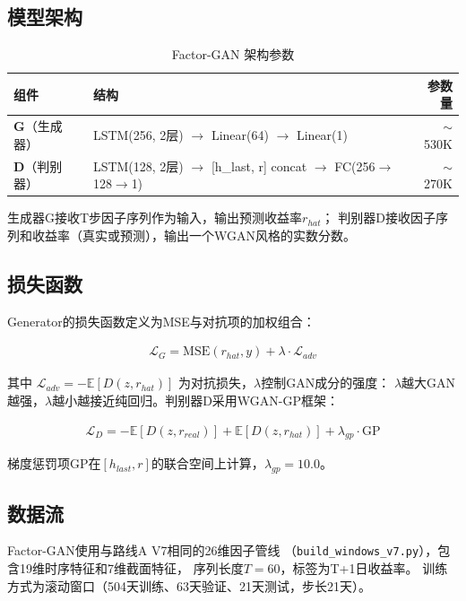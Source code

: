 \documentclass[12pt,a4paper]{ctexart}
\begin{document}
\subsection{模型架构}

\begin{table}[htbp]
\centering
\caption{Factor-GAN 架构参数}
\label{tab:factor_gan_arch}
\begin{tabular}{llr}
\toprule
组件 & 结构 & 参数量 \\
\midrule
\textbf{G}（生成器） & LSTM(256, 2层) $\to$ Linear(64) $\to$ Linear(1) & $\sim$530K \\
\textbf{D}（判别器） & LSTM(128, 2层) $\to$ [h\_last, r] concat $\to$ FC(256$\to$128$\to$1) & $\sim$270K \\
\bottomrule
\end{tabular}
\end{table}

生成器G接收T步因子序列作为输入，输出预测收益率$r_{hat}$；
判别器D接收因子序列和收益率（真实或预测），输出一个WGAN风格的实数分数。

\subsection{损失函数}

Generator的损失函数定义为MSE与对抗项的加权组合：

\begin{align}
    \mathcal{L}_G = \text{MSE}(r_{hat}, y) + \lambda \cdot \mathcal{L}_{adv}
\end{align}

其中 $\mathcal{L}_{adv} = -\mathbb{E}[D(z, r_{hat})]$ 为对抗损失，$\lambda$控制GAN成分的强度：
$\lambda$越大GAN越强，$\lambda$越小越接近纯回归。判别器D采用WGAN-GP框架：

\begin{align}
    \mathcal{L}_D = -\mathbb{E}[D(z, r_{real})] + \mathbb{E}[D(z, r_{hat})] + \lambda_{gp} \cdot \text{GP}
\end{align}

梯度惩罚项GP在$[h_{last}, r]$的联合空间上计算，$\lambda_{gp}=10.0$。

\subsection{数据流}

Factor-GAN使用与路线A V7相同的26维因子管线
（\texttt{build\_windows\_v7.py}），包含19维时序特征和7维截面特征，
序列长度$T=60$，标签为T+1日收益率。
训练方式为滚动窗口（504天训练、63天验证、21天测试，步长21天）。
\end{document}
